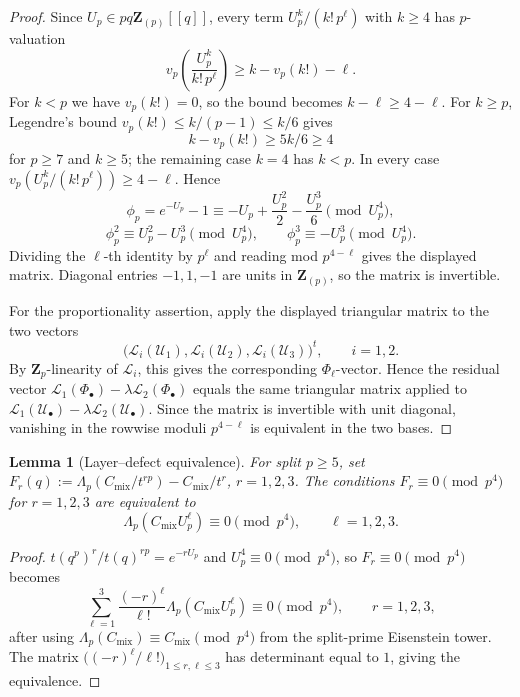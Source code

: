 \documentclass[11pt]{amsart}
\newtheorem{lemma}[theorem]{Lemma}
\theoremstyle{definition}
\theoremstyle{remark}
\newcommand{\Z}{\mathbf{Z}}
\begin{document}
\begin{proof}
Since $U_p\in pq\Z_{(p)}[[q]]$, every term $U_p^k/(k!\,p^\ell)$ with $k\ge 4$ has $p$-valuation
\[
v_p\!\left(\frac{U_p^k}{k!\,p^\ell}\right)\ge k-v_p(k!)-\ell.
\]
For $k<p$ we have $v_p(k!)=0$, so the bound becomes $k-\ell\ge 4-\ell$. For $k\ge p$, Legendre's bound $v_p(k!)\le k/(p-1)\le k/6$ gives
\[
k-v_p(k!)\ge 5k/6\ge 4
\]
for $p\ge 7$ and $k\ge 5$; the remaining case $k=4$ has $k<p$. In every case $v_p(U_p^k/(k!\,p^\ell))\ge 4-\ell$. Hence
\[
\phi_p=e^{-U_p}-1\equiv -U_p+\frac{U_p^2}{2}-\frac{U_p^3}{6}\pmod{U_p^4},
\]
\[
\phi_p^2\equiv U_p^2-U_p^3\pmod{U_p^4},\qquad
\phi_p^3\equiv -U_p^3\pmod{U_p^4}.
\]
Dividing the $\ell$-th identity by $p^\ell$ and reading mod $p^{4-\ell}$ gives the displayed matrix. Diagonal entries $-1,1,-1$ are units in $\Z_{(p)}$, so the matrix is invertible.

For the proportionality assertion, apply the displayed triangular matrix to the two vectors
\[
\bigl(\mathcal L_i(\mathcal U_1),\mathcal L_i(\mathcal U_2),\mathcal L_i(\mathcal U_3)\bigr)^t,\qquad i=1,2.
\]
By $\Z_p$-linearity of $\mathcal L_i$, this gives the corresponding $\Phi_\ell$-vector. Hence the residual vector $\mathcal L_1(\Phi_\bullet)-\lambda\mathcal L_2(\Phi_\bullet)$ equals the same triangular matrix applied to $\mathcal L_1(\mathcal U_\bullet)-\lambda\mathcal L_2(\mathcal U_\bullet)$. Since the matrix is invertible with unit diagonal, vanishing in the rowwise moduli $p^{4-\ell}$ is equivalent in the two bases.
\end{proof}

\begin{lemma}[Layer--defect equivalence]\label{lem:layer-defect}
For split $p\ge 5$, set $F_r(q):=\Lambda_p(C_{\mathrm{mix}}/t^{rp})-C_{\mathrm{mix}}/t^r$, $r=1,2,3$. The conditions $F_r\equiv 0\pmod{p^4}$ for $r=1,2,3$ are equivalent to
\[
\Lambda_p(C_{\mathrm{mix}}U_p^\ell)\equiv 0\pmod{p^4},\qquad \ell=1,2,3.
\]
\end{lemma}

\begin{proof}
$t(q^p)^r/t(q)^{rp}=e^{-rU_p}$ and $U_p^4\equiv 0\pmod{p^4}$, so $F_r\equiv 0\pmod{p^4}$ becomes
\[
\sum_{\ell=1}^3\frac{(-r)^\ell}{\ell!}\Lambda_p(C_{\mathrm{mix}}U_p^\ell)\equiv 0\pmod{p^4},\qquad r=1,2,3,
\]
after using $\Lambda_p(C_{\mathrm{mix}})\equiv C_{\mathrm{mix}}\pmod{p^4}$ from the split-prime Eisenstein tower. The matrix $\bigl((-r)^\ell/\ell!\bigr)_{1\le r,\ell\le 3}$ has determinant equal to $1$, giving the equivalence.
\end{proof}
\end{document}
